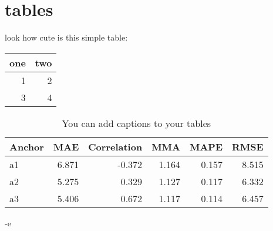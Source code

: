 \section{tables}
\label{sec:orgb3fbedc}

look how cute is this simple table:

\begin{center}
\begin{tabular}{rr}
one & two\\
\hline
1 & 2\\
3 & 4\\
\end{tabular}
\end{center}

\begin{table}[htbp]
\caption{\label{tab:orgebb7605}
You can add captions to your tables}
\centering
\begin{tabular}{lrrrrr}
Anchor & MAE & Correlation & MMA & MAPE & RMSE\\
\hline
a1 & 6.871 & -0.372 & 1.164 & 0.157 & 8.515\\
a2 & 5.275 & 0.329 & 1.127 & 0.117 & 6.332\\
a3 & 5.406 & 0.672 & 1.117 & 0.114 & 6.457\\
\end{tabular}
\end{table}
-e 

